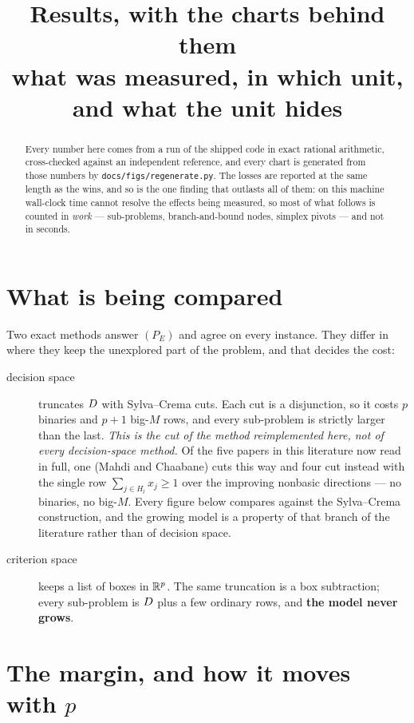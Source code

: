 \documentclass[11pt,a4paper]{article}
\title{Results, with the charts behind them\\
\large what was measured, in which unit, and what the unit hides}
\author{}
\date{}
\begin{document}
\maketitle

\begin{abstract}
Every number here comes from a run of the shipped code in exact rational
arithmetic, cross-checked against an independent reference, and every chart is
generated from those numbers by \texttt{docs/figs/regenerate.py}.  The losses
are reported at the same length as the wins, and so is the one finding that
outlasts all of them: on this machine wall-clock time cannot resolve the
effects being measured, so most of what follows is counted in \emph{work} ---
sub-problems, branch-and-bound nodes, simplex pivots --- and not in seconds.
\end{abstract}

\tableofcontents

\section{What is being compared}

Two exact methods answer $(P_E)$ and agree on every instance.  They differ in
where they keep the unexplored part of the problem, and that decides the cost:

\begin{description}
\item[decision space] truncates $D$ with Sylva--Crema cuts.  Each cut is a
  disjunction, so it costs $p$ binaries and $p+1$ big-$M$ rows, and every
  sub-problem is strictly larger than the last.  \emph{This is the cut of the
  method reimplemented here, not of every decision-space method.}  Of the
  five papers in this literature now read in full, one (Mahdi and Chaabane)
  cuts this way and four cut instead with the single row
  $\sum_{j \in H_l} x_j \geqslant 1$ over the improving nonbasic
  directions --- no binaries, no big-$M$.  Every figure below compares
  against the Sylva--Crema construction, and the growing model is a property
  of that branch of the literature rather than of decision space.
\item[criterion space] keeps a list of boxes in $\mathbb{R}^p$.  The same truncation is
  a box subtraction; every sub-problem is $D$ plus a few ordinary rows, and
  \textbf{the model never grows}.
\end{description}

\section{The margin, and how it moves with $p$}
\end{document}
